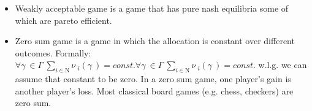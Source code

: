 \documentclass[]{report}
\begin{document}
\begin{itemize}
\item Weakly acceptable game 
is a game that has pure nash equilibria some of which are pareto efficient.
\item Zero sum game 
is a game in which the allocation is constant over different outcomes. Formally:
${\displaystyle \forall \gamma \ \in \Gamma \ \sum _{i\in \mathrm {N} }\nu \ _{i}(\gamma \ )=const.} \forall \gamma \ \in \Gamma \ \sum _{i\in \mathrm {N} }\nu \ _{i}(\gamma \ )=const.$
w.l.g. we can assume that constant to be zero. In a zero sum game, one player's gain is another player's loss. Most classical board games (e.g. chess, checkers) are zero sum.

\end{itemize}
\end{document}
